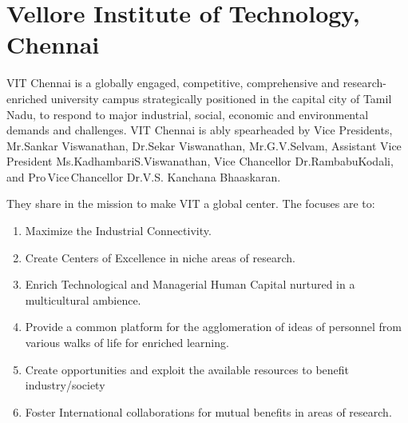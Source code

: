
\section{Vellore Institute of Technology, Chennai}
VIT Chennai is a globally engaged, competitive, comprehensive and research-enriched university campus strategically positioned in the capital city of Tamil Nadu, to respond to major industrial, social, economic and environmental demands and challenges. VIT Chennai is ably spearheaded by Vice Presidents, Mr.\;Sankar Viswanathan, Dr.\;Sekar Viswanathan, Mr.\;G.V.\;Selvam, Assistant Vice President Ms.\;Kadhambari\;S.\;Viswanathan, Vice Chancellor Dr.\;Rambabu\;Kodali, and Pro\,Vice\,Chancellor Dr.\;V.S. Kanchana Bhaaskaran. 

They share in the mission to make VIT a global center. The focuses are to:

\begin{enumerate}[label={\color{primaryColor}$\bullet$}]
	\item Maximize the Industrial Connectivity.
	\item Create Centers of Excellence in niche areas of research.
	\item Enrich Technological and Managerial Human Capital nurtured in a multicultural ambience.
	\item Provide a common platform for the agglomeration of ideas of personnel from various walks of life for enriched learning.
	\item Create opportunities and exploit the available resources to benefit industry/society
	\item Foster International collaborations for mutual benefits in areas of research.
\end{enumerate}


